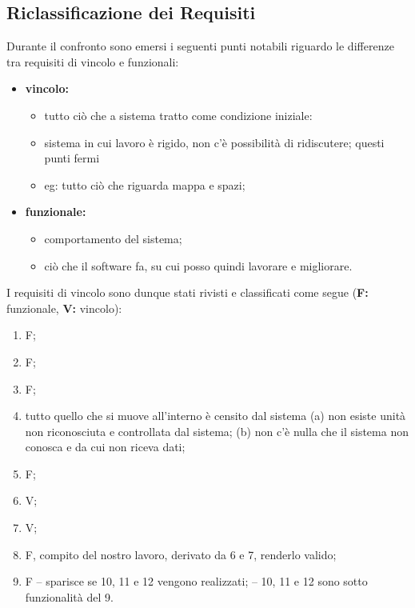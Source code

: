 \subsection{Riclassificazione dei Requisiti}
\label{req}
    Durante il confronto sono emersi i seguenti punti notabili riguardo le differenze tra requisiti di vincolo e funzionali:
    \begin{itemize}
        \item \textbf{vincolo: }
            \begin{itemize}
                \item tutto ciò che a sistema tratto come condizione iniziale:
                \item sistema in cui lavoro è rigido, non c'è possibilità di ridiscutere; questi punti fermi
                \item eg: tutto ciò che riguarda mappa e spazi;
            \end{itemize}
        \item \textbf{funzionale: }
            \begin{itemize}
                \item comportamento del sistema;
                \item ciò che il software fa, su cui posso quindi lavorare e migliorare.
            \end{itemize}
    \end{itemize}
    I requisiti di vincolo sono dunque stati rivisti e classificati come segue (\textbf{F: }funzionale, \textbf{V: }vincolo):
    \begin{enumerate}
        \item F;
        \item F;
        \item F;
        \item tutto quello che si muove all'interno è censito dal sistema
            \subitem (a) \; non esiste unità non riconosciuta e controllata dal sistema;
            \subitem (b) \; non c'è nulla che il sistema non conosca e da cui non riceva dati;
        \item F;
        \item V;
        \item V;
        \item F, compito del nostro lavoro, derivato da 6 e 7, renderlo valido;
        \item F
            \subitem -- sparisce se 10, 11 e 12 vengono realizzati;
            \subitem -- 10, 11 e 12 sono sotto funzionalità del 9.

    \end{enumerate}

